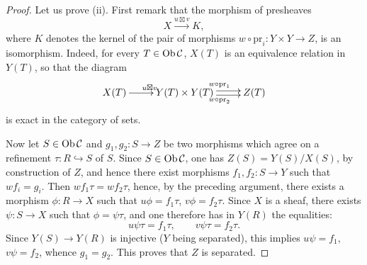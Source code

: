 \begin{proof}
Let us prove (ii). First remark that the morphism of presheaves
\[
X\xrightarrow{u\boxtimes v}K,
\]
where \(K\) denotes the kernel of the pair of morphisms
\(w\circ\mathrm{pr}_i:Y\times Y\to Z\), is an isomorphism.
Indeed, for every \(T\in\operatorname{Ob}\mathcal C\), \(X(T)\) is an
equivalence relation in \(Y(T)\), so that the diagram
\[
\xymatrix{
X(T)\ar[r]^{u\boxtimes v} & Y(T)\times Y(T)
\ar@<.5ex>[r]^{w\circ\mathrm{pr}_1}
\ar@<-.5ex>[r]_{w\circ\mathrm{pr}_2} & Z(T) }
\]
is exact in the category of sets.

Now let \(S\in\operatorname{Ob}\mathcal C\) and \(g_1,g_2:S\to Z\) be two
morphisms which agree on a refinement \(\tau:R\hookrightarrow S\)
of \(S\). Since \(S\in\operatorname{Ob}\mathcal C\), one has
\(Z(S)=Y(S)/X(S)\), by construction of \(Z\), and hence there
exist morphisms \(f_1,f_2:S\to Y\) such that \(wf_i=g_i\).
Then \(wf_1\tau=wf_2\tau\), hence, by the preceding argument,
there exists a morphism \(\phi:R\to X\) such that
\(u\phi=f_1\tau\), \(v\phi=f_2\tau\).
Since \(X\) is a sheaf, there exists \(\psi:S\to X\) such that
\(\phi=\psi\tau\), and one therefore has in \(Y(R)\) the equalities:
\[
u\psi\tau=f_1\tau,\qquad v\psi\tau=f_2\tau.
\]
Since \(Y(S)\to Y(R)\) is injective (\(Y\) being separated),
this implies \(u\psi=f_1\), \(v\psi=f_2\), whence \(g_1=g_2\).
This proves that \(Z\) is separated.
\end{proof}

